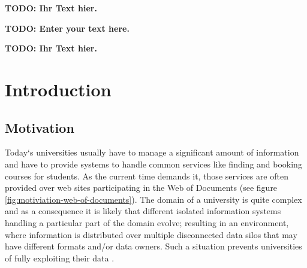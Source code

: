 \documentclass[draft,final]{vutinfth} %
\newcommand{\todo}[1]{{\color{red}\textbf{TODO: {#1}}}} %
\begin{document}
\frontmatter %

\addstatementpage

\begin{danksagung*}
\todo{Ihr Text hier.}
\end{danksagung*}

\begin{acknowledgements*}
\todo{Enter your text here.}
\end{acknowledgements*}

\begin{kurzfassung}
\todo{Ihr Text hier.}
\end{kurzfassung}

\begin{abstract}
\todo{Enter your text here.}
\end{abstract}


\tableofcontents %

\mainmatter

\chapter{Introduction}

\section{Motivation}
Today`s universities usually have to manage a significant amount of information and have to provide systems to handle common services like finding and booking courses for students. As the current time demands it, those services are often provided over web sites participating in the Web of Documents (see figure \ref{fig:motiviation-web-of-documents}). The domain of a university is quite complex and as a consequence it is likely that different isolated information systems handling a particular part of the domain evolve; resulting in an environment, where information is distributed over multiple disconnected data silos that may have different formats and/or data owners. Such a situation prevents universities of fully exploiting their data \cite{zablith_consuming_2011}. 
\end{document}
